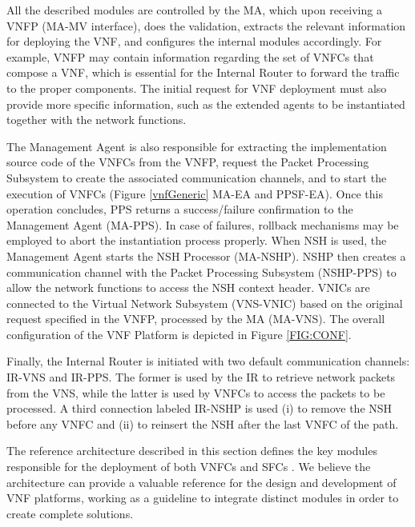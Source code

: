 
 All the described modules are controlled by the MA, which upon receiving a VNFP (MA-MV interface), does the validation, extracts the relevant information for deploying the VNF, and configures the internal modules accordingly. For example, VNFP may contain information regarding the set of VNFCs that compose a VNF, which is essential for the Internal Router to forward the traffic to the proper components. The initial request for VNF deployment must also provide more specific information, such as the extended agents to be instantiated together with the network functions.

The Management Agent is also responsible for extracting the implementation source code of the VNFCs from the VNFP, request the Packet Processing Subsystem to create the associated communication channels, and to start the execution of VNFCs (Figure \ref{vnfGeneric} MA-EA and PPSF-EA). Once this operation concludes, PPS returns a success/failure confirmation to the Management Agent (MA-PPS). In case of failures, rollback mechanisms may be employed to abort the instantiation process properly. When NSH is used, the Management Agent starts the NSH Processor (MA-NSHP). NSHP then creates a communication channel with the Packet Processing Subsystem (NSHP-PPS) to allow the network functions to access the NSH context header. VNICs are connected to the Virtual Network Subsystem (VNS-VNIC) based on the original request specified in the VNFP, processed by the MA (MA-VNS). The overall configuration of the VNF Platform is depicted in Figure \ref{FIG:CONF}.


Finally, the Internal Router is initiated with two default communication channels: IR-VNS and IR-PPS. The former is used by the IR to retrieve network packets from the VNS, while the latter is used by VNFCs to access the packets to be processed. A third connection labeled IR-NSHP is used (i) to remove the NSH before any VNFC and (ii) to reinsert the NSH after the last VNFC of the path.

The reference architecture described in this section defines the key modules responsible for the deployment of both VNFCs and SFCs \cite{Joel-2015}. We believe the architecture can provide a valuable reference for the design and development of VNF platforms, working as a guideline to integrate distinct modules in order to create complete solutions.
